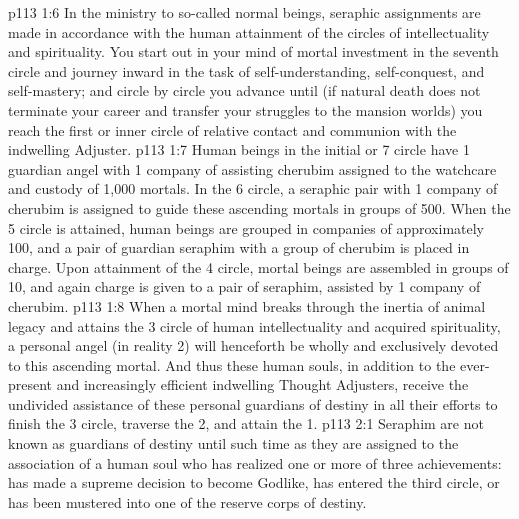 \vs p113 1:6 \pc In the ministry to so\hyp{}called normal beings, seraphic assignments are made in accordance with the human attainment of the circles of intellectuality and spirituality. You start out in your mind of mortal investment in the seventh circle and journey inward in the task of self\hyp{}understanding, self\hyp{}conquest, and self\hyp{}mastery; and circle by circle you advance until (if natural death does not terminate your career and transfer your struggles to the mansion worlds) you reach the first or inner circle of relative contact and communion with the indwelling Adjuster.
\vs p113 1:7 Human beings in the initial or 7 circle have 1 guardian angel with 1 company of assisting cherubim assigned to the watchcare and custody of 1,000 mortals. In the 6 circle, a seraphic pair with 1 company of cherubim is assigned to guide these ascending mortals in groups of 500. When the 5 circle is attained, human beings are grouped in companies of approximately 100, and a pair of guardian seraphim with a group of cherubim is placed in charge. Upon attainment of the 4 circle, mortal beings are assembled in groups of 10, and again charge is given to a pair of seraphim, assisted by 1 company of cherubim.
\vs p113 1:8 When a mortal mind breaks through the inertia of animal legacy and attains the 3 circle of human intellectuality and acquired spirituality, a personal angel (in reality 2) will henceforth be wholly and exclusively devoted to this ascending mortal. And thus these human souls, in addition to the ever\hyp{}present and increasingly efficient indwelling Thought Adjusters, receive the undivided assistance of these personal guardians of destiny in all their efforts to finish the 3 circle, traverse the 2, and attain the 1.
\vs p113 2:1 Seraphim are not known as guardians of destiny until such time as they are assigned to the association of a human soul who has realized one or more of three achievements: has made a supreme decision to become Godlike, has entered the third circle, or has been mustered into one of the reserve corps of destiny.
